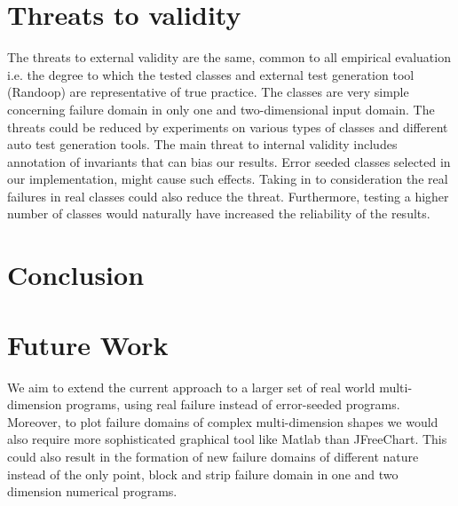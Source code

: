 \documentclass{acm_proc_article-sp}
\begin{document}
\section{Threats to validity}
The threats to external validity are the same, common to all empirical evaluation i.e. the degree to which the tested classes and external test generation tool (Randoop) are representative of true practice. The classes are very simple concerning failure domain in only one and two-dimensional input domain. The threats could be reduced by experiments on various types of classes and different auto test generation tools. The main threat to internal validity includes annotation of invariants that can bias our results. Error seeded classes selected in our implementation, might cause such effects. Taking in to consideration the real failures in real classes could also reduce the threat. Furthermore, testing a higher number of classes would naturally have increased the reliability of the results.

\section{Conclusion}

\section{Future Work}
We aim to extend the current approach to a larger set of real world multi-dimension programs, using real failure instead of error-seeded programs. Moreover, to plot failure domains of complex multi-dimension shapes we would also require more sophisticated graphical tool like Matlab than JFreeChart. This could also result in the formation of new failure domains of different nature instead of the only point, block and strip failure domain in one and two dimension numerical programs. 
\end{document}
